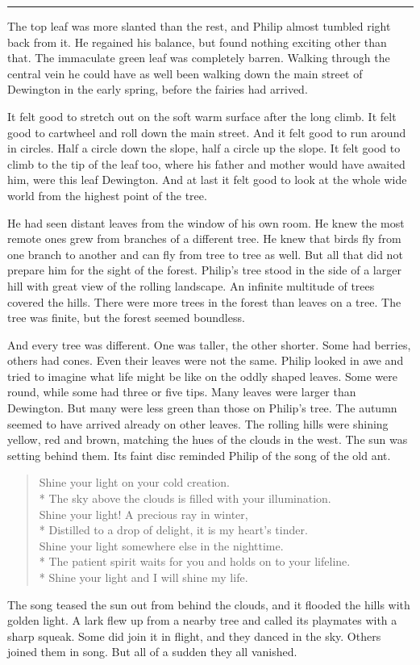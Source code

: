 \documentclass[10pt, draft]{memoir}
\renewcommand{\pfbreakdisplay}{\bigskip \ding{166} \bigskip}
\newcommand{\secbreak}{\fancybreak{\pfbreakdisplay}}
\newcommand{\sunsong}{
  Shine your light on your cold creation. \\*
  The sky above the clouds is filled with your illumination. \\
  Shine your light! A precious ray in winter, \\*
  Distilled to a drop of delight, it is my heart's tinder. \\
  Shine your light somewhere else in the nighttime. \\*
  The patient spirit waits for you and holds on to your lifeline. \\*
  Shine your light and I will shine my life.
}
\begin{document}
\secbreak

The top leaf was more slanted than the rest, and Philip almost tumbled right
back from it. He regained his balance, but found nothing exciting other than
that. The immaculate green leaf was completely barren. Walking through the
central vein he could have as well been walking down the main street of
Dewington in the early spring, before the fairies had arrived.

It felt good to stretch out on the soft warm surface after the long climb. It
felt good to cartwheel and roll down the main street. And it felt good to run
around in circles. Half a circle down the slope, half a circle up the slope. It
felt good to climb to the tip of the leaf too, where his father and mother
would have awaited him, were this leaf Dewington. And at last it felt good to
look at the whole wide world from the highest point of the tree.

He had seen distant leaves from the window of his own room. He knew the most
remote ones grew from branches of a different tree. He knew that birds fly from
one branch to another and can fly from tree to tree as well. But all that did
not prepare him for the sight of the forest. Philip's tree stood in the side of
a larger hill with great view of the rolling landscape. An infinite multitude
of trees covered the hills. There were more trees in the forest than leaves on
a tree. The tree was finite, but the forest seemed boundless.

And every tree was different. One was taller, the other shorter. Some had
berries, others had cones. Even their leaves were not the same. Philip looked
in awe and tried to imagine what life might be like on the oddly shaped leaves.
Some were round, while some had three or five tips. Many leaves were larger
than Dewington. But many were less green than those on Philip's tree. The
autumn seemed to have arrived already on other leaves. The rolling hills were
shining yellow, red and brown, matching the hues of the clouds in the west.
The sun was setting behind them. Its faint disc reminded Philip of the song of
the old ant.


\begin{verse}
\sunsong
\end{verse}


The song teased the sun out from behind the clouds, and it flooded the hills
with golden light. A lark flew up from a nearby tree and called its playmates
with a sharp squeak. Some did join it in flight, and they danced in the sky.
Others joined them in song. But all of a sudden they all vanished.
\end{document}
